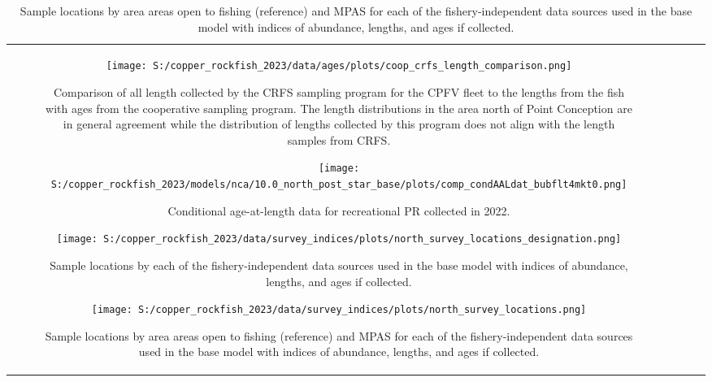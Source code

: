 \documentclass[11pt,
  letterpaper,
]{article}
\begin{document}
\begin{longtable}[t]{c>{\centering\arraybackslash}p{2cm}>{\centering\arraybackslash}p{2cm}>{\centering\arraybackslash}p{2cm}}
\begin{figure}
{\centering
\texttt{[image: S:/copper\_rockfish\_2023/data/ages/plots/coop\_crfs\_length\_comparison.png]}
}
\caption{Comparison of all length collected by the CRFS sampling program for the CPFV fleet to the lengths from the fish with ages from the cooperative sampling program. The length distributions in the area north of Point Conception are in general agreement while the distribution of lengths collected by this program does not align with the length samples from CRFS.\label{fig:coop-len-comparison}}
\end{figure}

\pagebreak

\begin{figure}
{\centering
\texttt{[image: S:/copper\_rockfish\_2023/models/nca/10.0\_north\_post\_star\_base/plots/comp\_condAALdat\_bubflt4mkt0.png]}
}
\caption{Conditional age-at-length data for recreational PR collected in 2022.\label{fig:rec-pr-caal-data}}
\end{figure}

\pagebreak

\begin{figure}
{\centering
\texttt{[image: S:/copper\_rockfish\_2023/data/survey\_indices/plots/north\_survey\_locations\_designation.png]}
}
\caption{Sample locations by each of the fishery-independent data sources used in the base model with indices of abundance, lengths, and ages if collected.\label{fig:survey-locations}}
\end{figure}

\pagebreak

\begin{figure}
{\centering
\texttt{[image: S:/copper\_rockfish\_2023/data/survey\_indices/plots/north\_survey\_locations.png]}
}
\caption{Sample locations by area areas open to fishing (reference) and MPAS for each of the fishery-independent data sources used in the base model with indices of abundance, lengths, and ages if collected.\label{fig:ref-mpa}}
\end{figure}


\end{longtable}
\end{document}
